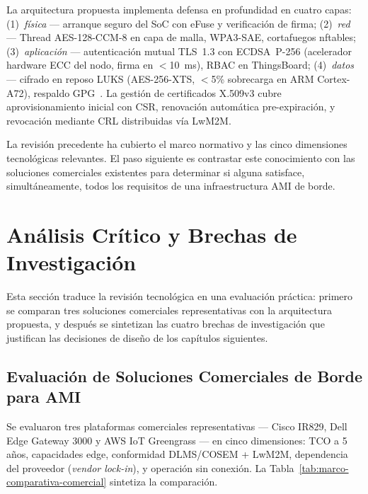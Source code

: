 La arquitectura propuesta implementa defensa en profundidad en cuatro capas: (1)~\textit{física} --- arranque seguro del SoC con eFuse y verificación de firma; (2)~\textit{red} --- Thread AES-128-CCM-8 en capa de malla, WPA3-SAE, cortafuegos nftables; (3)~\textit{aplicación} --- autenticación mutual TLS~1.3 con ECDSA~P-256 (acelerador hardware ECC del nodo, firma en $<$10~ms), RBAC en ThingsBoard; (4)~\textit{datos} --- cifrado en reposo LUKS (AES-256-XTS, $<$5\% sobrecarga en ARM Cortex-A72), respaldo GPG~\cite{alsuwaidiSecuringSmartGrid2024}. La gestión de certificados X.509v3 cubre aprovisionamiento inicial con CSR, renovación automática pre-expiración, y revocación mediante CRL distribuidas vía LwM2M.

La revisión precedente ha cubierto el marco normativo y las cinco dimensiones tecnológicas relevantes. El paso siguiente es contrastar este conocimiento con las soluciones comerciales existentes para determinar si alguna satisface, simultáneamente, todos los requisitos de una infraestructura AMI de borde.


\section{Análisis Crítico y Brechas de Investigación}
\label{sec:marco-analisis-critico}

Esta sección traduce la revisión tecnológica en una evaluación práctica: primero se comparan tres soluciones comerciales representativas con la arquitectura propuesta, y después se sintetizan las cuatro brechas de investigación que justifican las decisiones de diseño de los capítulos siguientes.

\subsection{Evaluación de Soluciones Comerciales de Borde para AMI}
\label{sec:marco-soluciones-comerciales}

Se evaluaron tres plataformas comerciales representativas --- Cisco IR829, Dell Edge Gateway 3000 y AWS IoT Greengrass --- en cinco dimensiones: TCO a 5 años, capacidades edge, conformidad DLMS/COSEM + LwM2M, dependencia del proveedor (\textit{vendor lock-in}), y operación sin conexión. La Tabla~\ref{tab:marco-comparativa-comercial} sintetiza la comparación.

